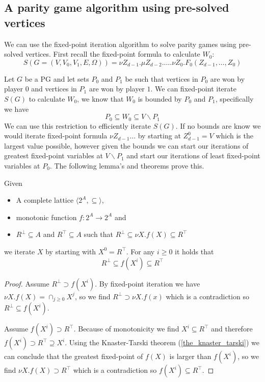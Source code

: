 \subsection{A parity game algorithm using pre-solved vertices}
We can use the fixed-point iteration algorithm to solve parity games using pre-solved vertices. First recall the fixed-point formula to calculate $W_0$:
\[ S(G = (V,V_0,V_1,E,\Omega)) = \nu Z_{d-1}. \mu Z_{d-2}. \dots . \nu Z_0. F_0(Z_{d-1},\dots,Z_0) \]

Let $G$ be a PG and let sets $P_0$ and $P_1$ be such that vertices in $P_0$ are won by player $0$ and vertices in $P_1$ are won by player $1$. We can fixed-point iterate $S(G)$ to calculate $W_0$, we know that $W_0$ is bounded by $P_0$ and $P_1$, specifically we have
\[ P_0 \subseteq W_0 \subseteq V\backslash P_1\]
We can use this restriction to efficiently iterate $S(G)$. If no bounds are know we would iterate fixed-point formula $\nu Z_{d-1}\dots$ by starting at $Z_{d-1}^0 = V$ which is the largest value possible, however given the bounds we can start our iterations of greatest fixed-point variables at $V\backslash P_1$ and start our iterations of least fixed-point variables at $P_0$. The following lemma's and theorems prove this.
\begin{lemma}
	\label{lem_fixpoint_bounds_nu}
	Given
	\begin{itemize}
		\item A complete lattice $\langle 2^A, \subseteq \rangle$,
		\item monotonic function $f : 2^A \rightarrow 2^A$ and
		\item $R^\bot \subseteq A$ and $R^\top \subseteq A$ such that $R^\bot \subseteq \nu X. f(X) \subseteq R^\top$
	\end{itemize}
	we iterate $X$ by starting with $X^0 = R^\top$. For any $i \geq 0$ it holds that
	\[ R^\bot \subseteq f(X^i) \subseteq R^\top \]
	\begin{proof}
		Assume $R^\bot \supset f(X^i)$. By fixed-point iteration we have $\nu X.f(X) = \cap_{j\geq0} X^j$, so we find $R^\bot \supset \nu X.f(x)$ which is a contradiction so $R^\bot \subseteq f(X^i)$.
		
		Assume $f(X^i) \supset R^\top$. Because of monotonicity we find $X^i \subseteq R^\top$ and therefore $f(X^i) \supset R^\top \supseteq X^i$. Using the Knaster-Tarski theorem (\ref{the_knaster_tarski}) we can conclude that the greatest fixed-point of $f(X)$ is larger than $f(X^i)$, so we find $\nu X.f(X) \supset R^\top$ which is a contradiction so $f(X^i) \subseteq R^\top$.
	\end{proof}
\end{lemma}

